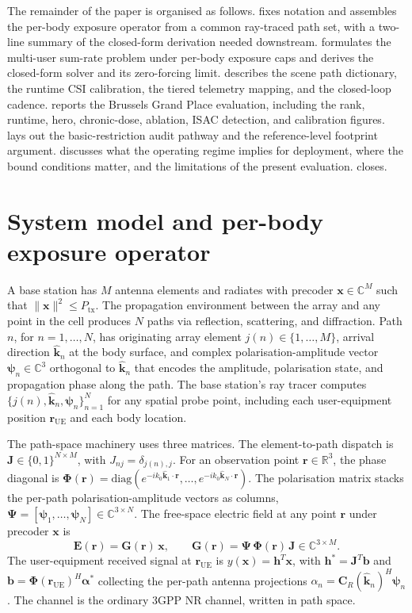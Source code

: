 \documentclass[journal,twocolumn,10pt]{IEEEtran}
\theoremstyle{plain}
\theoremstyle{remark}
\newcommand{\khat}{\hat{\bm{k}}}
\newcommand{\rr}{\mathbf{r}}
\newcommand{\xx}{\mathbf{x}}
\newcommand{\hh}{\mathbf{h}}
\newcommand{\bvec}{\mathbf{b}}
\newcommand{\GG}{\mathbf{G}}
\newcommand{\Jmat}{\mathbf{J}}
\newcommand{\Phimat}{\mathbf{\Phi}}
\newcommand{\Psimat}{\bm{\Psi}}
\newcommand{\psin}{\bm{\psi}_n}
\newcommand{\Complex}{\mathbb{C}}
\begin{document}
The remainder of the paper is organised as follows.
 fixes notation and assembles the per-body exposure
operator from a common ray-traced path set, with a two-line summary
of the closed-form derivation needed downstream. 
formulates the multi-user sum-rate problem under per-body exposure
caps and derives the closed-form solver and its zero-forcing limit.
 describes the scene path dictionary, the runtime CSI
calibration, the tiered telemetry mapping, and the closed-loop
cadence.  reports the Brussels Grand Place evaluation,
including the rank, runtime, hero, chronic-dose, ablation, ISAC
detection, and calibration figures.  lays out
the basic-restriction audit pathway and the reference-level footprint
argument.  discusses what the operating regime
implies for deployment, where the bound conditions matter, and the
limitations of the present evaluation.  closes.


\section{System model and per-body exposure operator}\label{sec:setup}

A base station has $M$ antenna elements and radiates with precoder
$\xx \in \Complex^M$ such that $\|\xx\|^2 \leq P_{\mathrm{tx}}$. The
propagation environment between the array and any point in the cell
produces $N$ paths via reflection, scattering, and diffraction. Path
$n$, for $n = 1, \ldots, N$, has originating array element
$j(n) \in \{1, \ldots, M\}$, arrival direction $\khat_n$ at the body
surface, and complex polarisation-amplitude vector
$\psin \in \Complex^3$ orthogonal to $\khat_n$ that encodes the
amplitude, polarisation state, and propagation phase along the path.
The base station's ray tracer computes
$\{j(n), \khat_n, \psin\}_{n=1}^N$ for any spatial probe point,
including each user-equipment position $\rr_{\mathrm{UE}}$ and each
body location.

The path-space machinery uses three matrices. The element-to-path
dispatch is $\Jmat \in \{0, 1\}^{N \times M}$, with
$J_{nj} = \delta_{j(n), j}$. For an observation point
$\rr \in \mathbb{R}^3$, the phase diagonal is
$\Phimat(\rr) = \mathrm{diag}(e^{-i k_0 \khat_1 \cdot \rr}, \ldots,
e^{-i k_0 \khat_N \cdot \rr})$. The polarisation matrix stacks the
per-path polarisation-amplitude vectors as columns,
$\Psimat = [\bm\psi_1, \ldots, \bm\psi_N] \in \Complex^{3 \times N}$.
The free-space electric field at any point $\rr$ under precoder $\xx$
is
\begin{equation}\label{eq:E-decomp}
  \mathbf{E}(\rr) = \GG(\rr)\,\xx,
  \qquad
  \GG(\rr) = \Psimat\,\Phimat(\rr)\,\Jmat \in \Complex^{3 \times M}.
\end{equation}
The user-equipment received signal at $\rr_{\mathrm{UE}}$ is
$y(\xx) = \hh^T \xx$, with $\hh^* = \Jmat^T \bvec$ and
$\bvec = \Phimat(\rr_{\mathrm{UE}})^H \bm\alpha^*$ collecting the
per-path antenna projections
$\alpha_n = \mathbf{C}_R(\khat_n)^H \psin$. The channel is the
ordinary 3GPP NR channel, written in path space.
\end{document}
